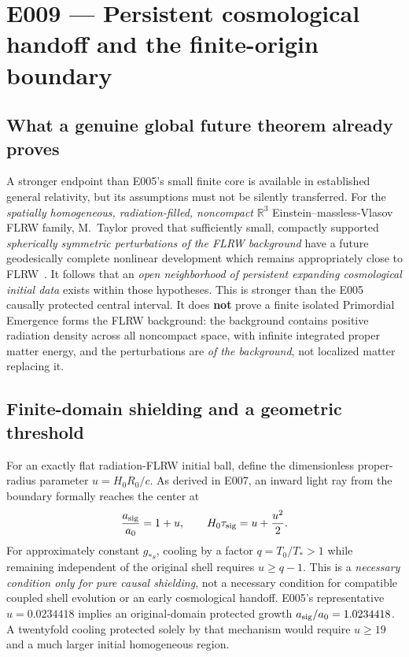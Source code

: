 \documentclass[11pt,a4paper]{article}
\theoremstyle{tmon}
\theoremstyle{definition}
\begin{document}
\section{E009 --- Persistent cosmological handoff and the finite-origin boundary}\label{sec:e009}
\subsection{What a genuine global future theorem already proves}
A stronger endpoint than E005's small finite core is available in established general relativity, but its assumptions must not be silently transferred. For the \emph{spatially homogeneous, radiation-filled, noncompact} $\mathbb R^3$ Einstein--massless-Vlasov FLRW family, M.~Taylor proved that sufficiently small, compactly supported \emph{spherically symmetric perturbations of the FLRW background} have a future geodesically complete nonlinear development which remains appropriately close to FLRW~\cite{Taylor2024}. It follows that an \emph{open neighborhood of persistent expanding cosmological initial data} exists within those hypotheses. This is stronger than the E005 causally protected central interval. It does \textbf{not} prove a finite isolated Primordial Emergence forms the FLRW background: the background contains positive radiation density across all noncompact space, with infinite integrated proper matter energy, and the perturbations are \emph{of the background}, not localized matter replacing it.

\subsection{Finite-domain shielding and a geometric threshold}
For an exactly flat radiation-FLRW initial ball, define the dimensionless proper-radius parameter $u=H_0R_0/c$. As derived in E007, an inward light ray from the boundary formally reaches the center at
\[
\frac{a_{\rm sig}}{a_0}=1+u,\qquad H_0\tau_{\rm sig}=u+\frac{u^2}{2}.
\]
For approximately constant $g_{*s}$, cooling by a factor $q=T_0/T_*>1$ while remaining independent of the original shell requires $\boxed{u\ge q-1}$. This is a \emph{necessary condition only for pure causal shielding}, not a necessary condition for compatible coupled shell evolution or an early cosmological handoff. E005's representative $u=0.0234418$ implies an original-domain protected growth $a_{\rm sig}/a_0=1.0234418$. A twentyfold cooling protected solely by that mechanism would require $u\ge19$ and a much larger initial homogeneous region.
\end{document}
